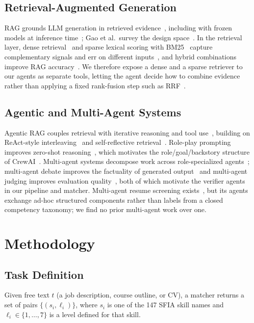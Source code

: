 \documentclass[conference]{IEEEtran}
\begin{document}
\subsection{Retrieval-Augmented Generation}
RAG grounds LLM generation in retrieved evidence~\cite{lewis2020rag}, including with frozen models at inference time~\cite{ram2023incontext}; Gao et al.\ survey the design space~\cite{gao2023ragsurvey}. In the retrieval layer, dense retrieval~\cite{karpukhin2020dpr} and sparse lexical scoring with BM25~\cite{robertson2009bm25} capture complementary signals and err on different inputs~\cite{luan2021sparse,thakur2021beir,chen2022spar}, and hybrid combinations improve RAG accuracy~\cite{sawarkar2024blended}. We therefore expose a dense and a sparse retriever to our agents as separate tools, letting the agent decide how to combine evidence rather than applying a fixed rank-fusion step such as RRF~\cite{cormack2009rrf}.

\subsection{Agentic and Multi-Agent Systems}
Agentic RAG couples retrieval with iterative reasoning and tool use~\cite{singh2025agenticrag}, building on ReAct-style interleaving~\cite{yao2023react} and self-reflective retrieval~\cite{asai2024selfrag}. Role-play prompting improves zero-shot reasoning~\cite{kong2024roleplay}, which motivates the role/goal/backstory structure of CrewAI~\cite{moura2023crewai}. Multi-agent systems decompose work across role-specialized agents~\cite{wu2024autogen,hong2024metagpt,qian2024chatdev}; multi-agent debate improves the factuality of generated output~\cite{du2024debate} and multi-agent judging improves evaluation quality~\cite{chan2024chateval}, both of which motivate the verifier agents in our pipeline and matcher. Multi-agent resume screening exists~\cite{screening2025multiagent}, but its agents exchange ad-hoc structured components rather than labels from a closed competency taxonomy; we find no prior multi-agent work over one.

\section{Methodology}\label{sec:methodology}

\subsection{Task Definition}
Given free text $t$ (a job description, course outline, or CV), a matcher returns a set of pairs $\{(s_i, \ell_i)\}$, where $s_i$ is one of the 147 SFIA skill names and $\ell_i \in \{1,\dots,7\}$ is a level defined for that skill.
\end{document}
